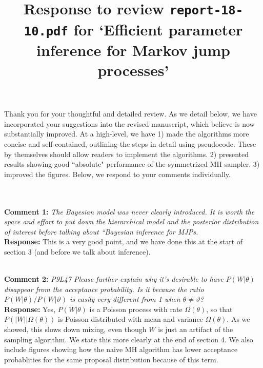 \documentclass[11pt]{article}
\title{Response to review {\texttt{report-18-10.pdf}} for `Efficient parameter inference for Markov jump processes'}
\author{}
\date{}
\newcommand{\rev}[2]{\textbf{Comment #1: }\emph{#2}}
\newcommand{\resp}{\textbf{Response: }}
\begin{document}
\maketitle

Thank you for your thoughtful and detailed review. As we detail below, we have incorporated your suggestions into the revised manuscript, which believe is now substantially improved. At a high-level, we have 1) made the algorithms more concise and self-contained, outlining the steps in detail using pseudocode. These by themselves should allow readers to implement the algorithms. 2) presented results showing good ``absolute" performance of the symmetrized MH sampler. 3) improved the figures.
Below, we respond to your comments individually.

~\\~\\

\noindent \rev{1}{The Bayesian model was never clearly introduced. It is worth the space and effort to put down the hierarchical model and the posterior distribution of interest before talking about “Bayesian inference for MJPs.} \\
\resp This is a very good point, and we have done this at the start of section 3 (and before we talk about inference).

~\\
\rev{2}{P9L47 Please further explain why it’s desirable to have $P(W|\theta)$ disappear from the acceptance probability. Is it because the ratio 
$P(W|\theta)/P(W |\vartheta)$ is easily very different from 1 when $\theta \neq \vartheta$?} \\
\resp Yes, $P(W|\theta)$ is a Poisson process with rate $\Omega(\theta)$, so that $P(|W||\Omega(\theta))$ is Poisson distributed with mean and variance $\Omega(\theta)$. 
As we showed, this slows down mixing, even though $W$ is just an artifact of the sampling algorithm.
We state this more clearly at the end of section 4. 
We also include figures showing how the naive MH algorithm has lower acceptance probablities for the same proposal distribution because of this term. 
\end{document}
